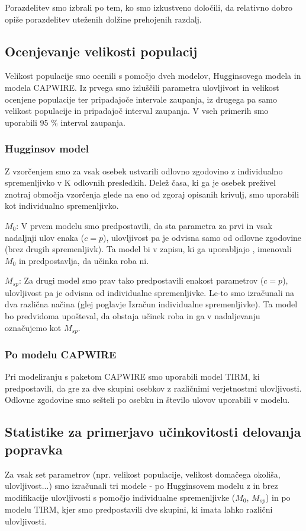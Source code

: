 Porazdelitev smo izbrali po tem, ko smo izkustveno določili, da relativno dobro opiše porazdelitev uteženih dolžine prehojenih razdalj.

\subsection{Ocenjevanje velikosti populacij}
Velikost populacije smo ocenili s pomočjo dveh modelov, Hugginsovega modela in modela CAPWIRE. Iz prvega smo izluščili parametra ulovljivost in velikost ocenjene populacije ter pripadajoče intervale zaupanja, iz drugega pa samo velikost populacije in pripadajoč interval zaupanja. V vseh primerih smo uporabili 95 \% interval zaupanja.

\subsubsection{Hugginsov model}
Z vzorčenjem smo za vsak osebek ustvarili odlovno zgodovino z individualno spremenljivko v K odlovnih presledkih. Delež časa, ki ga je osebek preživel znotraj območja vzorčenja glede na eno od zgoraj opisanih krivulj, smo uporabili kot individualno spremenljivko.

$M_0$: V prvem modelu smo predpostavili, da sta parametra za prvi in vsak nadaljnji ulov enaka ($c = p$), ulovljivost pa je odvisna samo od odlovne zgodovine (brez drugih spremenljivk). Ta model bi v zapisu, ki ga uporabljajo \citep{otis_statistical_1978}, imenovali $M_0$ in predpostavlja, da učinka roba ni.

$M_{sp}$: Za drugi model smo prav tako predpostavili enakost parametrov ($c = p$), ulovljivost pa je odvisna od individualne spremenljivke. Le-to smo izračunali na dva različna načina (glej poglavje Izračun individualne spremenljivke). Ta model bo predvidoma upošteval, da obstaja učinek roba in ga v nadaljevanju označujemo kot $M_{sp}$.

\subsubsection{Po modelu CAPWIRE}
Pri modeliranju s paketom CAPWIRE smo uporabili model TIRM, ki predpostavili, da gre za dve skupini osebkov z različnimi verjetnostmi ulovljivosti. Odlovne zgodovine smo sešteli po osebku in število ulovov uporabili v modelu.

\subsection{Statistike za primerjavo učinkovitosti delovanja popravka}
Za vsak set parametrov (npr. velikost populacije, velikost domačega okoliša, ulovljivost...) smo izračunali tri modele - po Hugginsovem modelu z in brez modifikacije ulovljivosti s pomočjo individualne spremenljivke ($M_0$, $M_{sp}$) in po modelu TIRM, kjer smo predpostavili dve skupini, ki imata lahko različni ulovljivosti.


